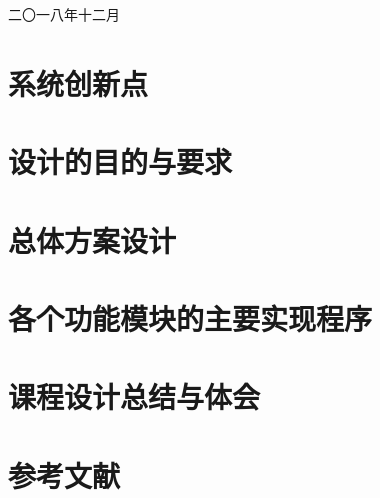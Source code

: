 \documentclass[12pt]{article}
\begin{document}
	\vspace{2cm}
	
	\begin{center}
		\fontsize{18pt}{18pt} \selectfont 二〇一八年十二月
	\end{center}


\newpage
\section {系统创新点}
\section {设计的目的与要求}
\section {总体方案设计}
\section {各个功能模块的主要实现程序}
\section {课程设计总结与体会}
\section {参考文献}
\end{document}

